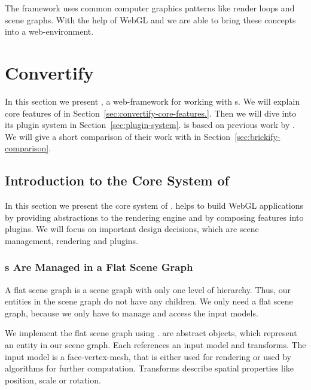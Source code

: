 \documentclass[../ClassicThesis.tex]{subfiles}
\begin{document}
The framework {\convertify} uses common computer graphics
patterns like render loops and scene graphs. With the help
of WebGL and {\threejs} we are able to bring these concepts
into a web-environment.


\section{Convertify}
\label{sec:framework-convertify}

In this section we present {\convertify}, a web-framework
for working with {\threedmodel}s. We will explain core
features of {\convertify} in
Section~\ref{sec:convertify-core-features.}. Then we will
dive into its plugin system in
Section~\ref{sec:plugin-system}. {\convertify} is based on
previous work by \citeauthor{brickify-thesis}. We will give
a short comparison of their work with {\convertify} in
Section~\ref{sec:brickify-comparison}.



\subsection{Introduction to the Core System of {\convertify}}
\label{sec:convertify-core-features}

In this section we present the core system of {\convertify}.
{\convertify} helps to build WebGL applications by providing
abstractions to the rendering engine and by composing
features into plugins. We will focus on important design
decisions, which are scene management, rendering and
plugins.

\subsubsection{{\threedmodel}s Are Managed in a Flat Scene
  Graph}

A flat scene graph is a scene graph with only one level of
hierarchy. Thus, our entities in the scene graph do not have
any children. We only need a flat scene graph, because we
only have to manage and access the input models.

We implement the flat scene graph using .
 are abstract objects, which represent an
entity in our scene graph. Each  references an
input model and transforms. The input model is a
face-vertex-mesh, that is either used for rendering or used
by algorithms for further computation. Transforms
describe spatial properties like position, scale or
rotation.
\end{document}
